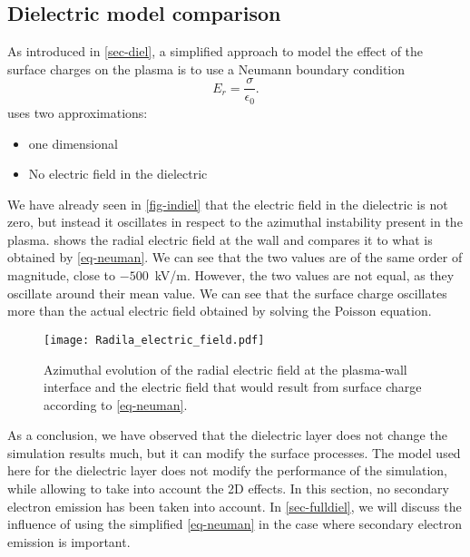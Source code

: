     
  \subsection{Dielectric model comparison} \label{subsec-modelcomp}

  
  As introduced in \cref{sec-diel}, a simplified approach to model the effect of the surface charges on the plasma is to use a Neumann boundary condition \citep{taccogna2019}
  \begin{equation} \label{eq-neuman}
    E_r = \frac{\sigma}{\epsilon_0}.
  \end{equation}
   uses two approximations\string:
  \begin{itemize}
    \item one dimensional
    \item No electric field in the dielectric
  \end{itemize}
  We have already seen in \cref{fig-indiel} that the electric field in the dielectric is not zero, but instead it oscillates in respect to the azimuthal instability present in the plasma.  
   shows the radial electric field at the wall and compares it to what is obtained by \cref{eq-neuman}.
  We can see that the two values are of the same order of magnitude, close to $-500$~kV/m.
  However, the two values are not equal, as they oscillate around their mean value.
  We can see that the surface charge oscillates more than the actual electric field obtained by solving the Poisson equation.

\begin{figure}[!hbt]
  \centering
  \texttt{[image: Radila\_electric\_field.pdf]}
  \caption{Azimuthal evolution of the radial electric field at the plasma-wall interface and the electric field that would result from surface charge according to \cref{eq-neuman}.}
  \label{fig-spacial_comparaison}
\end{figure}
\renewcommand\subfigurewidth{0.45\textwidth}

  As a conclusion, we have observed that the dielectric layer does not change the simulation results much, but it can modify the surface processes.
  The model used here for the dielectric layer does not modify the performance of the simulation, while allowing to take into account the \ac{2D} effects.
  In this section, no secondary electron emission has been taken into account.
  In \cref{sec-fulldiel}, we will discuss the influence of using the simplified \cref{eq-neuman} in the case where secondary electron emission is important.

  